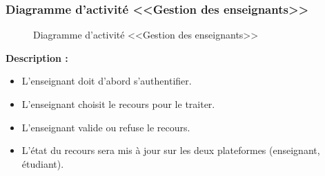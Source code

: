 \documentclass[12pt]{report}
\begin{document}
\newpage

\subsubsection{Diagramme d'activité <<Gestion des enseignants>>}

\begin{figure}[h]
\centering
    \centerline{}
    \caption{Diagramme d'activité <<Gestion des enseignants>>}
\end{figure}

\textbf{Description :}

\begin{itemize}
    \item L’enseignant doit d’abord s’authentifier.
    \item L’enseignant choisit le recours pour le traiter.
    \item L’enseignant valide ou refuse le recours.
    \item L’état du recours sera mis à jour sur les deux plateformes (enseignant, étudiant).
\end{itemize}
\end{document}
